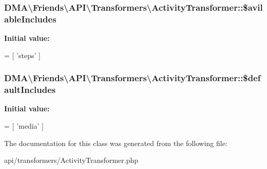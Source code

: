 \subsubsection[{\$avilable\+Includes}]{\setlength{\rightskip}{0pt plus 5cm}D\+M\+A\textbackslash{}\+Friends\textbackslash{}\+A\+P\+I\textbackslash{}\+Transformers\textbackslash{}\+Activity\+Transformer\+::\$avilable\+Includes\hspace{0.3cm}{\ttfamily [protected]}}\label{classDMA_1_1Friends_1_1API_1_1Transformers_1_1ActivityTransformer_ad7fbb8c6b7a80665f57afec58d71778c}
{\bfseries Initial value\+:}
\begin{DoxyCode}
= [
            \textcolor{stringliteral}{'steps'}
    ]
\end{DoxyCode}
\hypertarget{classDMA_1_1Friends_1_1API_1_1Transformers_1_1ActivityTransformer_a0f55e7ec2bc294c76b7145d322464900}{}
\subsubsection[{\$default\+Includes}]{\setlength{\rightskip}{0pt plus 5cm}D\+M\+A\textbackslash{}\+Friends\textbackslash{}\+A\+P\+I\textbackslash{}\+Transformers\textbackslash{}\+Activity\+Transformer\+::\$default\+Includes\hspace{0.3cm}{\ttfamily [protected]}}\label{classDMA_1_1Friends_1_1API_1_1Transformers_1_1ActivityTransformer_a0f55e7ec2bc294c76b7145d322464900}
{\bfseries Initial value\+:}
\begin{DoxyCode}
= [
            \textcolor{stringliteral}{'media'}
    ]
\end{DoxyCode}


The documentation for this class was generated from the following file\+:\begin{DoxyCompactItemize}
\item 
api/transformers/Activity\+Transformer.\+php\end{DoxyCompactItemize}
